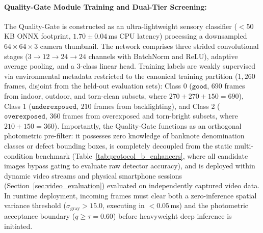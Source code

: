 \documentclass[final,5p,times,twocolumn,authoryear]{elsarticle}
\begin{document}
\paragraph{Quality-Gate Module Training and Dual-Tier Screening:}
The Quality-Gate is constructed as an ultra-lightweight sensory classifier ($<50$\,KB ONNX footprint, $1.70 \pm 0.04$\,ms CPU latency) processing a downsampled $64 \times 64 \times 3$ camera thumbnail. The network comprises three strided convolutional stages ($3 \to 12 \to 24 \to 24$ channels with BatchNorm and ReLU), adaptive average pooling, and a 3-class linear head. Training labels are weakly supervised via environmental metadata restricted to the canonical training partition ($1{,}260$ frames, disjoint from the held-out evaluation sets): Class 0 ($\texttt{good}$, $690$ frames from indoor, outdoor, and torn-clean subsets, where $270+270+150=690$), Class 1 ($\texttt{underexposed}$, $210$ frames from backlighting), and Class 2 ($\texttt{overexposed}$, $360$ frames from overexposed and torn-bright subsets, where $210+150=360$). Importantly, the Quality-Gate functions as an orthogonal photometric pre-filter: it possesses zero knowledge of banknote denomination classes or defect bounding boxes, is completely decoupled from the static multi-condition benchmark (Table~\ref{tab:protocol_b_enhancers}, where all candidate images bypass gating to evaluate raw detector accuracy), and is deployed within dynamic video streams and physical smartphone sessions (Section~\ref{sec:video_evaluation}) evaluated on independently captured video data. In runtime deployment, incoming frames must clear both a zero-inference spatial variance threshold ($\sigma_{\text{gray}} > 15.0$, executing in $<0.05$\,ms) and the photometric acceptance boundary ($q \ge \tau = 0.60$) before heavyweight deep inference is initiated.
\end{document}

